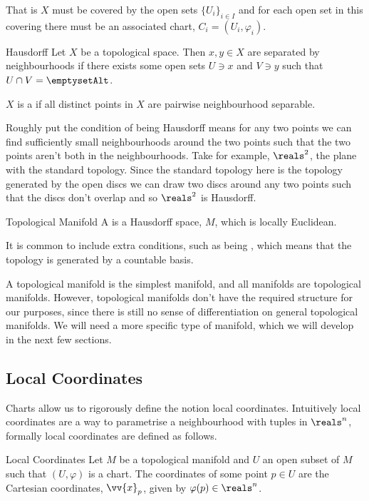 That is \(X\) must be covered by the open sets \(\{U_i\}_{i\in I}\) and for each open set in this covering there must be an associated chart, \(C_i = (U_i, \varphi_i)\).

\begin{dfn}{Hausdorff}{}
    Let \(X\) be a topological space.
    Then \(x, y \in X\) are separated by neighbourhoods if there exists some open sets \(U \ni x\) and \(V \ni y\) such that \(U \cap V = \emptysetAlt\).
    
    \(X\) is a  if all distinct points in \(X\) are pairwise neighbourhood separable.
\end{dfn}
Roughly put the condition of being Hausdorff means for any two points we can find sufficiently small neighbourhoods around the two points such that the two points aren't both in the neighbourhoods.
Take for example, \(\reals^2\), the plane with the standard topology.
Since the standard topology here is the topology generated by the open discs we can draw two discs around any two points such that the discs don't overlap and so \(\reals^2\) is Hausdorff.

\begin{dfn}{Topological Manifold}{}
    A  is a Hausdorff space, \(M\), which is locally Euclidean.
\end{dfn}

It is common to include extra conditions, such as being , which means that the topology is generated by a countable basis.

A topological manifold is the simplest manifold, and all manifolds are topological manifolds.
However, topological manifolds don't have the required structure for our purposes, since there is still no sense of differentiation on general topological manifolds.
We will need a more specific type of manifold, which we will develop in the next few sections.

\subsection{Local Coordinates}
Charts allow us to rigorously define the notion local coordinates.
Intuitively local coordinates are a way to parametrise a neighbourhood with tuples in \(\reals^n\), formally local coordinates are defined as follows.

\begin{dfn}{Local Coordinates}{}
    Let \(M\) be a topological manifold and \(U\) an open subset of \(M\) such that \((U, \varphi)\) is a chart.
    The coordinates of some point \(p \in U\) are the Cartesian coordinates, \(\vv{x}_p\), given by \(\varphi(p) \in \reals^n\).
\end{dfn}

